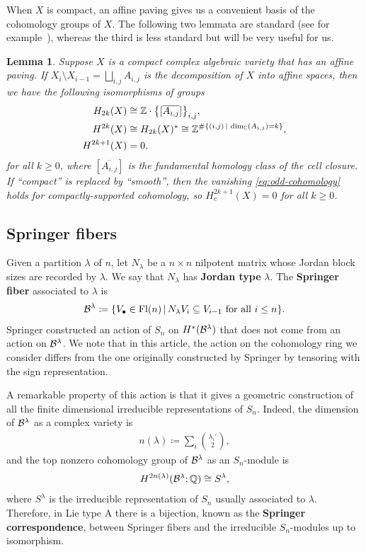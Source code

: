 \documentclass[11pt]{amsart}
\newtheorem{lemma}[theorem]{Lemma}     %
\theoremstyle{definition}
\newcommand{\st}{\,|\,}
\newcommand{\Fl}{\mathrm{Fl}}
\begin{document}
When $X$ is compact, an affine paving gives us a convenient basis of the cohomology groups of $X$. The following two lemmata are standard (see for example~\cite{Hotta-Springer}), whereas the third is less standard but will be very useful for us.

\begin{lemma}\label{lem:OddCohVanishes}
Suppose $X$ is a compact complex algebraic variety that has an affine paving. If $X_i\setminus X_{i-1} = \bigsqcup_{i,j} A_{i,j}$ is the decomposition of $X$ into affine spaces, then we have the following isomorphisms of groups
\begin{align}
    H_{2k}(X) &\cong \bZ \cdot \big\{[\overline{A_{i,j}}]\big\}_{i,j}, \\
    \label{eq:even-cohomology}
    H^{2k}(X) &\cong H_{2k}(X)^* \cong \bZ^{\#\{(i,j) \st \dim_\bC(A_{i,j}) = k\}}, \\ \label{eq:odd-cohomology}
    H^{2k+1}(X) & = 0,
\end{align}
for all $k\geq 0$, where $[\overline{A_{i,j}}]$ is the fundamental homology class of the cell closure. If ``compact'' is replaced by ``smooth'', then the vanishing \eqref{eq:odd-cohomology} holds for compactly-supported cohomology, so $H^{2k+1}_c(X) = 0$ for all $k\geq 0$.
\end{lemma}


\subsection{Springer fibers}

Given a partition $\lambda$ of $n$, let $N_\lambda$ be a $n\times n$ nilpotent matrix whose Jordan block sizes are recorded by $\lambda$. We say that $N_\lambda$ has {\bf Jordan type} $\lambda$. The {\bf Springer fiber} associated to $\lambda$ is
\begin{align}
    \cB^\lambda \coloneqq \{V_\bullet \in \Fl(n) \st N_\lambda V_i\subseteq V_{i-1} \text{ for all } i\leq n\}.
\end{align}
Springer constructed an action of $S_n$ on $H^*(\mathcal{B}^\lambda)$ that does not come from an action on $\mathcal{B}^\lambda$. We note that in this article, the action on the cohomology ring we consider differs from the one originally constructed by Springer by tensoring with the sign representation.

A remarkable property of this action is that it gives a geometric construction of all the finite dimensional irreducible representations of $S_n$. Indeed, the dimension of $\mathcal{B}^\lambda$ as a complex variety is 
\begin{align}
    n(\lambda) \coloneqq \sum_i \binom{\lambda_i'}{2},
\end{align}
and the top nonzero cohomology group of $\mathcal{B}^\lambda$ as an $S_n$-module is
\begin{align}
    H^{2n(\lambda)}(\mathcal{B}^\lambda;\mathbb{Q}) \cong S^\lambda,
\end{align}
where $S^\lambda$ is the irreducible representation of $S_n$ usually associated to $\lambda$.
Therefore, in Lie type A there is a bijection, known as the \textbf{Springer correspondence}, between Springer fibers and the irreducible $S_n$-modules up to isomorphism. 
\end{document}
